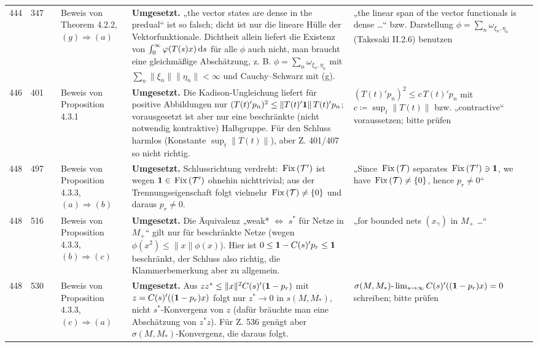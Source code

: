 \documentclass[10pt]{article}
\begin{document}
\begin{longtable}{@{}rrc>{\RaggedRight\arraybackslash}p{3.0cm}>{\RaggedRight\arraybackslash}p{11.4cm}>{\RaggedRight\arraybackslash}p{7.4cm}@{}}
444 & 347 & \sichC{} & Beweis von Theorem 4.2.2, $(g) \ensuremath{\Rightarrow} (a)$ & \textbf{Umgesetzt.} „the vector states are dense in the predual“ ist so falsch; dicht ist nur die lineare Hülle der Vektorfunktionale. Dichtheit allein liefert die Existenz von $\int_{0}^{\infty}\phi(T(s)x)\ds$ für alle $\phi$ auch nicht, man braucht eine gleichmäßige Abschätzung, z. B. $\phi = \sum_{n}\omega_{\xi_{n},\eta_{n}}$ mit $\sum_{n}\|\xi_{n}\|\|\eta_{n}\| < \infty$ und Cauchy–Schwarz mit (g). & „the linear span of the vector functionals is dense \dots{}“ bzw. Darstellung $\phi = \sum_{n}\omega_{\xi_{n},\eta_{n}}$ (Takesaki II.2.6) benutzen \\[2pt]
446 & 401 & \sichC{} & Beweis von Proposition 4.3.1 & \textbf{Umgesetzt.} Die Kadison-Ungleichung liefert für positive Abbildungen nur $(T(t)'p_{n})^{2} \leq \|T(t)'\1\|\,T(t)'p_{n}$; vorausgesetzt ist aber nur eine beschränkte (nicht notwendig kontraktive) Halbgruppe. Für den Schluss harmlos (Konstante $\sup_{t}\|T(t)\|$), aber Z. 401/407 so nicht richtig. & $(T(t)'p_{n})^{2} \leq c\,T(t)'p_{n}$ mit $c \coloneqq \sup_{t}\|T(t)\|$ bzw. „contractive“ voraussetzen; bitte prüfen \\[2pt]
448 & 497 & \sichC{} & Beweis von Proposition 4.3.3, $(a) \ensuremath{\Rightarrow} (b)$ & \textbf{Umgesetzt.} Schlussrichtung verdreht: $\mathop{}\mathrm{Fix}\left(\mathcal{T}'\right)$ ist wegen $\mathbf{1} \in \mathop{}\mathrm{Fix}\left(\mathcal{T}'\right)$ ohnehin nichttrivial; aus der Trennungseigenschaft folgt vielmehr $\mathop{}\mathrm{Fix}\left(\mathcal{T}\right) \neq \{0\}$ und daraus $p_{r} \neq 0$. & „Since $\mathop{}\mathrm{Fix}\left(\mathcal{T}\right)$ separates $\mathop{}\mathrm{Fix}\left(\mathcal{T}'\right) \ni \mathbf{1}$, we have $\mathop{}\mathrm{Fix}\left(\mathcal{T}\right) \neq \{0\}$, hence $p_{r} \neq 0$“ \\[2pt]
448 & 516 & \sichC{} & Beweis von Proposition 4.3.3, $(b) \ensuremath{\Rightarrow} (c)$ & \textbf{Umgesetzt.} Die Äquivalenz „weak* $\ensuremath{\Leftrightarrow}$ $s^{*}$ für Netze in $M_{+}$“ gilt nur für beschränkte Netze (wegen $\phi(x^{2}) \leq \|x\|\phi(x)$). Hier ist $0 \leq \1 - C(s)'p_{r} \leq \1$ beschränkt, der Schluss also richtig, die Klammerbemerkung aber zu allgemein. & „for bounded nets $(x_{\gamma})$ in $M_{+}$ \dots{}“ \\[2pt]
448 & 530 & \sichC{} & Beweis von Proposition 4.3.3, $(c) \ensuremath{\Rightarrow} (a)$ & \textbf{Umgesetzt.} Aus $zz^{*} \leq \|x\|^{2}C(s)'(\1-p_{r})$ mit $z = C(s)'((\mathbf{1}-p_{r})x)$ folgt nur $z^{*} \to 0$ in $s(M,M_{*})$, nicht $s^{*}$-Konvergenz von $z$ (dafür bräuchte man eine Abschätzung von $z^{*}z$). Für Z. 536 genügt aber $\sigma(M,M_{*})$-Konvergenz, die daraus folgt. & $\sigma(M,M_{*})\text{-}\lim_{s \to \infty} C(s)'((\mathbf{1}-p_{r})x) = 0$ schreiben; bitte prüfen \\[2pt]

\end{longtable}
\end{document}
